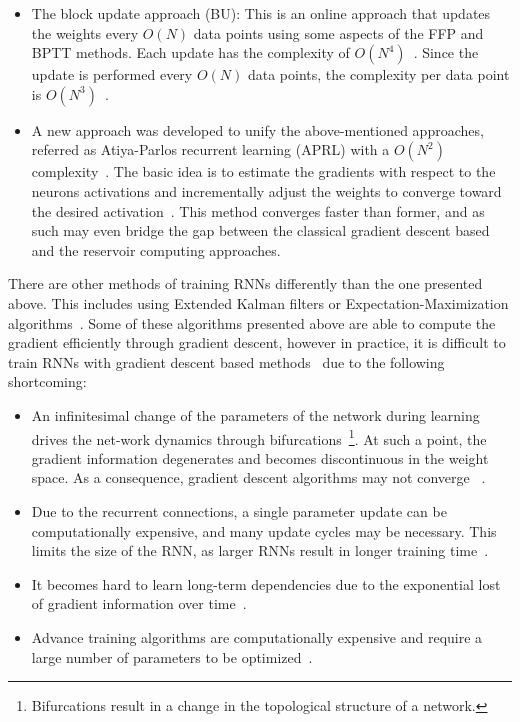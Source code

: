 \documentclass{WitsPhysicsReport}
\begin{document}
\begin{itemize}
\item The block update approach (BU): This is an online approach that updates the weights every $O(N)$ data points using some aspects of the  FFP  and  BPTT methods.  Each update has the complexity of $O(N^{4})$~\cite{schmidhuber1992fixed,williams1995gradient}. Since the update is performed every $O(N)$ data points,  the complexity per data point is $O(N^{3})$~\cite{williams1989complexity}.

\item A new approach was developed to unify the above-mentioned approaches, referred as Atiya-Parlos recurrent learning (APRL) with a $O(N^{2})$ complexity~\cite{atiya2000new}. The basic idea is to estimate the gradients with respect to the neurons activations and incrementally adjust the weights to converge toward the desired activation~\cite{lukovsevivcius2009reservoir}. This method converges faster than former, and as such may even bridge the gap between the classical gradient descent based and the reservoir computing approaches.
\label{item: RNN_learning_rules}
\end{itemize}



There are other methods of training RNNs differently than the one presented above. This includes using Extended Kalman filters or Expectation-Maximization algorithms~\cite{ma1998fast,puskorius1994neurocontrol}. Some of these algorithms presented above are able to compute the gradient efficiently through gradient descent, however in practice, it is difficult to train RNNs with gradient descent based methods~\cite{lukovsevivcius2009reservoir} due to the following shortcoming:


\begin{itemize}
\item An infinitesimal change of the parameters of the network during learning drives the net-work dynamics through bifurcations~\footnote{Bifurcations result in a change in the topological structure of a network.}.  At such a point, the gradient information degenerates and becomes discontinuous in the weight space.  As a consequence, gradient descent algorithms may not converge ~\cite{doya1992bifurcations}.

\item Due  to  the  recurrent  connections,  a  single  parameter  update  can  be  computationally expensive, and many update cycles may be necessary.  This limits the size of the RNN, as larger RNNs result in longer training time~\cite{lukovsevivcius2009reservoir}.

\item It becomes hard to learn long-term dependencies due to the exponential lost of gradient information over time~\cite{lukovsevivcius2009reservoir}.


\item Advance training algorithms are computationally expensive and require a large number of parameters to be optimized~\cite{lukovsevivcius2009reservoir}.
\label{item:shorcomings}
\end{itemize}
\end{document}
